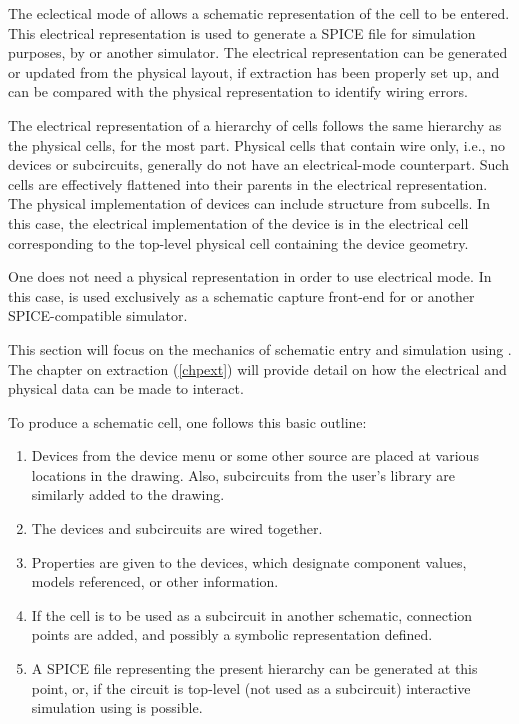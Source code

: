 The eclectical mode of {\Xic} allows a schematic representation of the
cell to be entered.  This electrical representation is used to
generate a SPICE file for simulation purposes, by {\WRspice} or
another simulator.  The electrical representation can be generated or
updated from the physical layout, if extraction has been properly set
up, and can be compared with the physical representation to identify
wiring errors.

The electrical representation of a hierarchy of cells follows the same
hierarchy as the physical cells, for the most part.  Physical cells
that contain wire only, i.e., no devices or subcircuits, generally do
not have an electrical-mode counterpart.  Such cells are effectively
flattened into their parents in the electrical representation.  The
physical implementation of devices can include structure from
subcells.  In this case, the electrical implementation of the device
is in the electrical cell corresponding to the top-level physical cell
containing the device geometry.

One does not need a physical representation in order to use electrical
mode.  In this case, {\Xic} is used exclusively as a schematic capture
front-end for {\WRspice} or another SPICE-compatible simulator.

This section will focus on the mechanics of schematic entry and
simulation using {\WRspice}.  The chapter on extraction (\ref{chpext})
will provide detail on how the electrical and physical data can be
made to interact.

To produce a schematic cell, one follows this basic outline:
\begin{enumerate}
\item{Devices from the device menu or some other source are placed at
  various locations in the drawing.  Also, subcircuits from the user's
  library are similarly added to the drawing.}

\item{The devices and subcircuits are wired together.}

\item{Properties are given to the devices, which designate component
  values, models referenced, or other information.}

\item{If the cell is to be used as a subcircuit in another schematic,
  connection points are added, and possibly a symbolic representation
  defined.}

\item{A SPICE file representing the present hierarchy can be generated
  at this point, or, if the circuit is top-level (not used as a
  subcircuit) interactive simulation using {\WRspice} is possible.}
\end{enumerate}

